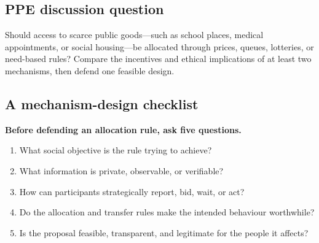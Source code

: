 \subsection*{PPE discussion question}

\noindent Should access to scarce public goods---such as school places, medical
appointments, or social housing---be allocated through prices, queues,
lotteries, or need-based rules? Compare the incentives and ethical implications
of at least two mechanisms, then defend one feasible design.

\subsection*{A mechanism-design checklist}

\begin{keyidea}
\textbf{Before defending an allocation rule, ask five questions.}
\begin{enumerate}
  \item What social objective is the rule trying to achieve?
  \item What information is private, observable, or verifiable?
  \item How can participants strategically report, bid, wait, or act?
  \item Do the allocation and transfer rules make the intended behaviour worthwhile?
  \item Is the proposal feasible, transparent, and legitimate for the people it affects?
\end{enumerate}
\end{keyidea}

